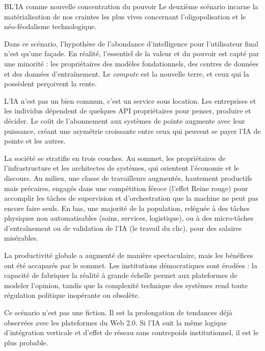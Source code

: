 \begin{scenariobox}{B}{L'IA comme nouvelle concentration du pouvoir}
Le deuxième scénario incarne la matérialisation de nos craintes les plus vives concernant l'oligopolisation et le néo-féodalisme technologique.

Dans ce scénario, l'hypothèse de l'abondance d'intelligence pour l'utilisateur final n'est qu'une façade. En réalité, l'essentiel de la valeur et du pouvoir est capté par une minorité : les propriétaires des modèles fondationnels, des centres de données et des données d'entraînement. Le \emph{compute} est la nouvelle terre, et ceux qui la possèdent perçoivent la rente.

L'IA n'est pas un bien commun, c'est un service sous location. Les entreprises et les individus dépendent de quelques API propriétaires pour penser, produire et décider. Le coût de l'abonnement aux systèmes de pointe augmente avec leur puissance, créant une asymétrie croissante entre ceux qui peuvent se payer l'IA de pointe et les autres.

La société se stratifie en trois couches. Au sommet, les propriétaires de l'infrastructure et les architectes de systèmes, qui orientent l'économie et le discours. Au milieu, une classe de travailleurs augmentés, hautement productifs mais précaires, engagés dans une compétition féroce (l'effet Reine rouge) pour accomplir les tâches de supervision et d'orchestration que la machine ne peut pas encore faire seuls. En bas, une majorité de la population, reléguée à des tâches physiques non automatisables (soins, services, logistique), ou à des micro-tâches d'entraînement ou de validation de l'IA (le travail du clic), pour des salaires misérables.

La productivité globale a augmenté de manière spectaculaire, mais les bénéfices ont été accaparés par le sommet. Les institutions démocratiques sont érodées : la capacité de fabriquer la réalité à grande échelle permet aux plateformes de modeler l'opinion, tandis que la complexité technique des systèmes rend toute régulation politique inopérante ou obsolète.

Ce scénario n'est pas une fiction. Il est la prolongation de tendances déjà observées avec les plateformes du Web 2.0. Si l'IA suit la même logique d'intégration verticale et d'effet de réseau sans contrepoids institutionnel, il est le plus probable.
\end{scenariobox}

